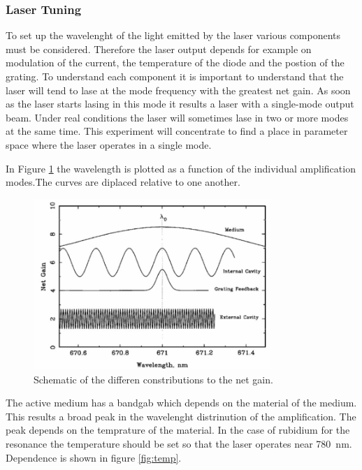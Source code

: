 \subsubsection{Laser Tuning}
\label{sec:Laser Tuning}

To set up the wavelenght of the light emitted by the laser various components must be considered.
Therefore the laser output depends for example on modulation of the current, the temperature of the diode and the postion of the grating.
To understand each component it is important to understand that the laser will tend to lase at the mode frequency with the greatest net gain.
As soon as the laser starts lasing in this mode it results a laser with a single-mode output beam. Under real conditions the laser will sometimes lase 
in two or more modes at the same time. This experiment will concentrate to find a place in parameter space where the laser operates in a single mode.

In Figure \ref{fig:netgain} the wavelength is plotted as a function of the individual amplification modes.The curves are diplaced relative
to one another.

\begin{figure}[H]
    \centering
    \includegraphics[width=0.8\textwidth]{content/graphics/net_gain_components.jpg}
    \caption{Schematic of the differen constributions to the net gain.} %
    \label{fig:netgain}
\end{figure}

The active medium has a bandgab which depends on the material of the medium. This results a broad peak in the wavelenght distrinution of the amplification.
The peak depends on the temprature of the material. In the case of rubidium for the resonance the temperature should be set so that the laser operates near 
\qty{780}{\nano\meter}.
Dependence is shown in figure \ref{fig:temp}.


